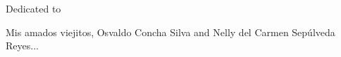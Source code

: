 \documentclass[]{book}
\begin{document}
\begin{dedication}

Dedicated to

Mis amados viejitos, Osvaldo Concha Silva and Nelly del Carmen Sep\'ulveda Reyes...
\end{dedication}

\tableofcontents

\listoffigures
{}

\listoftables
{}

% 








\listoftodos

%
%




\printindex
\end{document}
